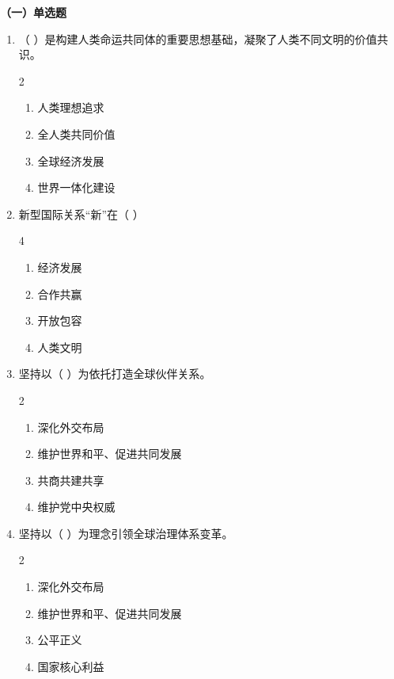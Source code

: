 \documentclass[a4paper,11pt]{ctexart}
\begin{document}
\textbf{（一）单选题}
\begin{enumerate}[start=4]
    \item （ ）是构建人类命运共同体的重要思想基础，凝聚了人类不同文明的价值共识。
    \begin{multicols}{2}
    \begin{enumerate}
        \item 人类理想追求
        \item 全人类共同价值
        \item 全球经济发展
        \item 世界一体化建设
    \end{enumerate}
    \end{multicols}

    \item 新型国际关系“新”在（ ）
    \begin{multicols}{4}
    \begin{enumerate}
        \item 经济发展
        \item 合作共赢
        \item 开放包容
        \item 人类文明
    \end{enumerate}
    \end{multicols}

    \item 坚持以（ ）为依托打造全球伙伴关系。
    \begin{multicols}{2}
    \begin{enumerate}
        \item 深化外交布局
        \item 维护世界和平、促进共同发展
        \item 共商共建共享
        \item 维护党中央权威
    \end{enumerate}
    \end{multicols}

    \item 坚持以（ ）为理念引领全球治理体系变革。
    \begin{multicols}{2}
    \begin{enumerate}
        \item 深化外交布局
        \item 维护世界和平、促进共同发展
        \item 公平正义
        \item 国家核心利益
    \end{enumerate}
    \end{multicols}


\end{enumerate}
\end{document}
